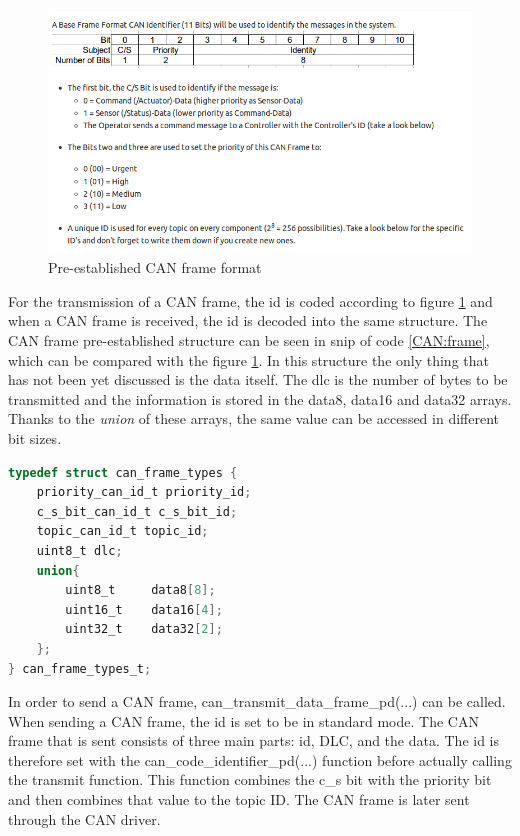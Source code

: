 \documentclass[12pt]{report}%
\begin{document}
\begin{figure}[ht]
	\centering
	\includegraphics[width=\textwidth]{can_structure}
    \caption{Pre-established CAN frame format \cite{DAEbot_Wiki}}
    \label{fig:can}
\end{figure}

For the transmission of a CAN frame, the id is coded according to figure \ref{fig:can} and when a CAN frame is received, the id is decoded into the same structure. The CAN frame pre-established structure can be seen in snip of code \ref{CAN:frame}, which can be compared with the figure \ref{fig:can}. In this structure the only thing that has not been yet discussed is the data itself. The dlc is the number of bytes to be transmitted and the information is stored in the data8, data16 and data32 arrays. Thanks to the \textit{union} of these arrays, the same value can be accessed in different bit sizes.

\begin{minipage}{\linewidth}
\begin{lstlisting}[caption = CAN frame, label = CAN:frame, language = C, captionpos = b]
typedef struct can_frame_types {
    priority_can_id_t priority_id;
    c_s_bit_can_id_t c_s_bit_id;
    topic_can_id_t topic_id;
    uint8_t dlc;
    union{
        uint8_t     data8[8];
        uint16_t    data16[4];
        uint32_t    data32[2];
    };
} can_frame_types_t;
\end{lstlisting}
\end{minipage}

In order to send a CAN frame, can\_transmit\_data\_frame\_pd(...) can be called. When sending a CAN frame, the id is set to be in standard mode. The CAN frame that is sent consists of three main parts: id, DLC, and the data. The id is therefore set with the can\_code\_identifier\_pd(...) function before actually calling the transmit function. This function combines the c\_s bit with the priority bit and then combines that value to the topic ID. The CAN frame is later sent through the CAN driver.
\end{document}
